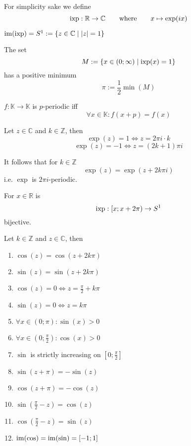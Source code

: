 For simplicity sake we define
\[\operatorname{ixp}: \mathbb{R} \to \mathbb{C} \qquad\text{where}\qquad x \mapsto \exp(ix)\]

\begin{theorem}
   \(\operatorname{im}(\operatorname{ixp}) = S^1 := \{z \in \mathbb{C} \mid \lvert z\rvert = 1\}\)
\end{theorem}

\begin{center}
   
\end{center}

\begin{theorem}
   The set
   \[M := \{x \in (0; \infty) \mid \operatorname{ixp}(x) = 1\}\]
   has a positive minimum
   \[\pi := \frac{1}{2} \min(M)\]
\end{theorem}

\begin{definition}
   \(f: \mathbb{K} \to \mathbb{K}\) is \(p\)-periodic iff
   \[\forall x \in \mathbb{K}: f(x + p) = f(x)\]
\end{definition}

\begin{theorem}
   Let \(z \in \mathbb{C}\) and \(k \in \mathbb{Z}\), then
   \[\exp(z) = 1 \iff z = 2 \pi i \cdot k\]
   \[\exp(z) = -1 \iff z = (2k + 1)\pi i\]
\end{theorem}
\begin{remark}
   It follows that for \(k \in \mathbb{Z}\)
   \[\exp(z) = \exp(z + 2k\pi i)\]
   i.e. \(\exp\) is \(2\pi i\)-periodic.
\end{remark}

\begin{theorem}
   For \(x \in \mathbb{R}\) is
   \[\operatorname{ixp}: [x; x + 2\pi) \to S^1\]
   bijective.
\end{theorem}

\begin{proposition}[Properties]
   Let \(k \in \mathbb{Z}\) and \(z \in \mathbb{C}\), then
   \begin{enumerate}[label=\roman*, align=Center]
      \item \(\cos(z) = \cos(z + 2k\pi)\)
      \item \(\sin(z) = \sin(z + 2k\pi)\)
      \item \(\cos(z) = 0 \iff z = \frac{\pi}{2} + k\pi\)
      \item \(\sin(z) = 0 \iff z = k\pi\)
      \item \(\forall x \in (0; \pi): \sin(x) > 0\)
      \item \(\forall x \in \left(0; \frac{\pi}{2}\right): \cos(x) > 0\)
      \item \(\sin\) is strictly increasing on \(\left[0; \frac{\pi}{2}\right]\)
      \item \(\sin(z + \pi) = -\sin(z)\)
      \item \(\cos(z + \pi) = -\cos(z)\)
      \item \(\sin\left(\frac{\pi}{2} - z\right) = \cos(z)\)
      \item \(\cos\left(\frac{\pi}{2} - z\right) = \sin(z)\)
      \item \(\operatorname{im}(\cos) = \operatorname{im}(\sin) = [-1;1]\)
   \end{enumerate}
\end{proposition}

